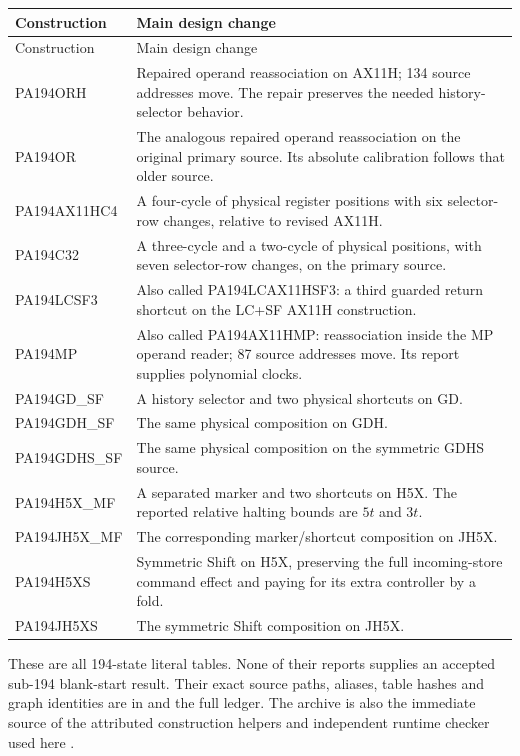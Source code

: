 \documentclass[10pt,a4paper]{article}
\theoremstyle{definition}
\begin{document}
\begin{longtable}{@{}>{\raggedright\arraybackslash}p{}>{\raggedright\arraybackslash}p{}@{}}
\toprule Construction & Main design change\\\midrule\endfirsthead
\toprule Construction & Main design change\\\midrule\endhead
\bottomrule\endfoot
PA194ORH & Repaired operand reassociation on AX11H; 134 source addresses
move. The repair preserves the needed history-selector behavior.\\
PA194OR & The analogous repaired operand reassociation on the original
primary source. Its absolute calibration follows that older source.\\
PA194AX11HC4 & A four-cycle of physical register positions with six
selector-row changes, relative to revised AX11H.\\
PA194C32 & A three-cycle and a two-cycle of physical positions, with seven
selector-row changes, on the primary source.\\
PA194LCSF3 & Also called PA194LCAX11HSF3: a third guarded return shortcut
on the LC+SF AX11H construction.\\
PA194MP & Also called PA194AX11HMP: reassociation inside the MP operand
reader; 87 source addresses move. Its report supplies polynomial clocks.\\
PA194GD\_SF & A history selector and two physical shortcuts on GD.\\
PA194GDH\_SF & The same physical composition on GDH.\\
PA194GDHS\_SF & The same physical composition on the symmetric GDHS source.\\
PA194H5X\_MF & A separated marker and two shortcuts on H5X. The reported
relative halting bounds are $5t$ and $3t$.\\
PA194JH5X\_MF & The corresponding marker/shortcut composition on JH5X.\\
PA194H5XS & Symmetric Shift on H5X, preserving the full incoming-store
command effect and paying for its extra controller by a fold.\\
PA194JH5XS & The symmetric Shift composition on JH5X.\\
\end{longtable}

These are all 194-state literal tables. None of their reports supplies an
accepted sub-194 blank-start result. Their exact source paths, aliases,
table hashes and graph identities are in
 and the full ledger. The
archive  is also the immediate
source of the attributed construction helpers and independent runtime
checker used here \cite{orh}.
\end{document}
